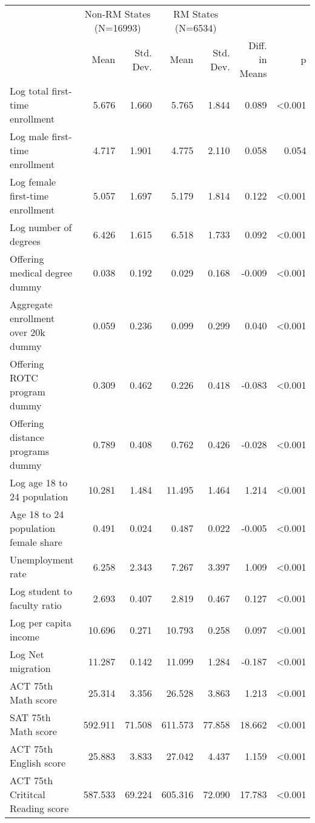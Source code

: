 \begin{table}
\centering
\begin{tabular}[t]{lrrrrrr}
\toprule
\multicolumn{1}{c}{ } & \multicolumn{2}{c}{Non-RM States (N=16993)} & \multicolumn{2}{c}{RM States (N=6534)} & \multicolumn{2}{c}{ } \\
\cmidrule(l{3pt}r{3pt}){2-3} \cmidrule(l{3pt}r{3pt}){4-5}
  & Mean & Std. Dev. & Mean & Std. Dev. & Diff. in Means & p\\
\midrule
Log total first-time enrollment & 5.676 & 1.660 & 5.765 & 1.844 & 0.089 & <0.001\\
Log male first-time enrollment & 4.717 & 1.901 & 4.775 & 2.110 & 0.058 & 0.054\\
Log female first-time enrollment & 5.057 & 1.697 & 5.179 & 1.814 & 0.122 & <0.001\\
Log number of degrees & 6.426 & 1.615 & 6.518 & 1.733 & 0.092 & <0.001\\
Offering medical degree dummy & 0.038 & 0.192 & 0.029 & 0.168 & -0.009 & <0.001\\
Aggregate enrollment over 20k dummy & 0.059 & 0.236 & 0.099 & 0.299 & 0.040 & <0.001\\
Offering ROTC program dummy & 0.309 & 0.462 & 0.226 & 0.418 & -0.083 & <0.001\\
Offering distance programs dummy & 0.789 & 0.408 & 0.762 & 0.426 & -0.028 & <0.001\\
Log age 18 to 24 population & 10.281 & 1.484 & 11.495 & 1.464 & 1.214 & <0.001\\
Age 18 to 24 population female share & 0.491 & 0.024 & 0.487 & 0.022 & -0.005 & <0.001\\
Unemployment rate & 6.258 & 2.343 & 7.267 & 3.397 & 1.009 & <0.001\\
Log student to faculty ratio & 2.693 & 0.407 & 2.819 & 0.467 & 0.127 & <0.001\\
Log per capita income & 10.696 & 0.271 & 10.793 & 0.258 & 0.097 & <0.001\\
Log Net migration & 11.287 & 0.142 & 11.099 & 1.284 & -0.187 & <0.001\\
ACT 75th Math score & 25.314 & 3.356 & 26.528 & 3.863 & 1.213 & <0.001\\
SAT 75th Math score & 592.911 & 71.508 & 611.573 & 77.858 & 18.662 & <0.001\\
ACT 75th English score & 25.883 & 3.833 & 27.042 & 4.437 & 1.159 & <0.001\\
ACT 75th Crititcal Reading score & 587.533 & 69.224 & 605.316 & 72.090 & 17.783 & <0.001\\

\end{tabular}
\end{table}
